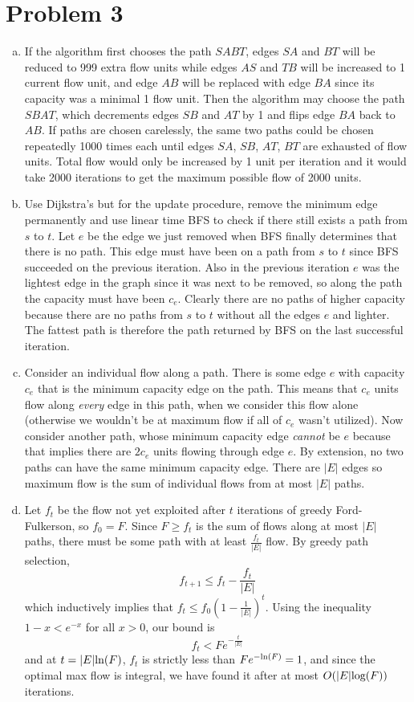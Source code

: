 \documentclass[11pt]{article}
\let\origleft\left
\let\origright\right
\renewcommand{\left}{\mathopen{}\mathclose\bgroup\origleft}
\renewcommand{\right}{\aftergroup\egroup\origright}
\newcommand{\p}[1]{\left(#1\right)}
\renewcommand{\log}[1]{\text{log}\p{#1}}
\renewcommand{\ln}[1]{\text{ln}\p{#1}}
\newcommand{\BigOh}[1]{O\p{#1}}
\begin{document}
\section*{Problem 3}
\begin{enumerate}[(a)]
\item If the algorithm first chooses the path $SABT$, edges $SA$ and $BT$ will be reduced to 999 extra flow units while edges $AS$ and $TB$ will be increased to 1 current flow unit, and edge $AB$ will be replaced with edge $BA$ since its capacity was a minimal 1 flow unit. Then the algorithm may choose the path $SBAT$, which decrements edges $SB$ and $AT$ by 1 and flips edge $BA$ back to $AB$. If paths are chosen carelessly, the same two paths could be chosen repeatedly 1000 times each until edges $SA$, $SB$, $AT$, $BT$ are exhausted of flow units. Total flow would only be increased by 1 unit per iteration and it would take 2000 iterations to get the maximum possible flow of 2000 units.
\item Use Dijkstra's but for the update procedure, remove the minimum edge permanently and use linear time BFS to check if there still exists a path from $s$ to $t$. Let $e$ be the edge we just removed when BFS finally determines that there is no path. This edge must have been on a path from $s$ to $t$ since BFS succeeded on the previous iteration. Also in the previous iteration $e$ was the lightest edge in the graph since it was next to be removed, so along the path the capacity must have been $c_e$. Clearly there are no paths of higher capacity because there are no paths from $s$ to $t$ without all the edges $e$ and lighter. The fattest path is therefore the path returned by BFS on the last successful iteration.
\item Consider an individual flow along a path. There is some edge $e$ with capacity $c_e$ that is the minimum capacity edge on the path. This means that $c_e$ units flow along \textit{every} edge in this path, when we consider this flow alone (otherwise we wouldn't be at maximum flow if all of $c_e$ wasn't utilized). Now consider another path, whose minimum capacity edge \textit{cannot} be $e$ because that implies there are $2c_e$ units flowing through edge $e$. By extension, no two paths can have the same minimum capacity edge. There are $|E|$ edges so maximum flow is the sum of individual flows from at most $|E|$ paths.
\item Let $f_t$ be the flow not yet exploited after $t$ iterations of greedy Ford-Fulkerson, so $f_0=F$. Since $F\geq f_t$ is the sum of flows along at most $|E|$ paths, there must be some path with at least $\frac{f_t}{|E|}$ flow. By greedy path selection, $$f_{t+1} \leq f_t-\frac{f_t}{|E|}$$ which inductively implies that $f_t \leq f_0(1-\frac1{|E|})^t$. Using the inequality $1-x < e^{-x}$ for all $x>0$, our bound is $$f_t < Fe^{-\frac t{|E|}}$$ and at $t=|E|\ln{F}$, $f_t$ is strictly less than $Fe^{-\ln{F}}=1$, and since the optimal max flow is integral, we have found it after at most $\BigOh{|E|\log{F}}$ iterations.
\end{enumerate}
\end{document}
